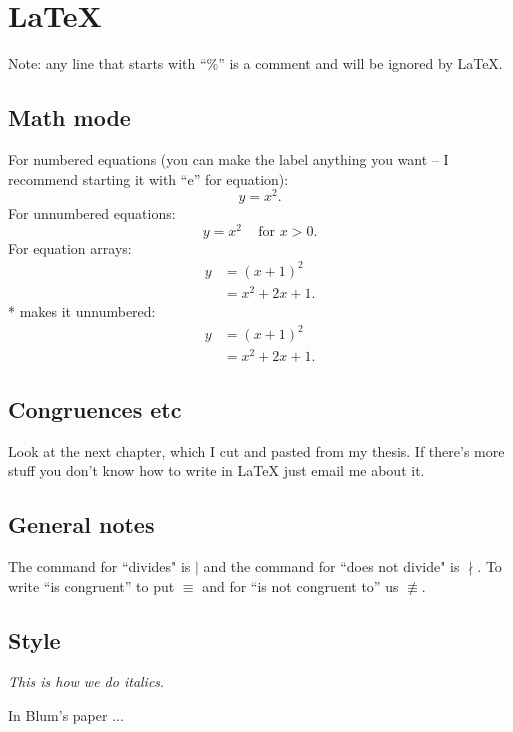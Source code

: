 
\chapter{LaTeX}

Note: any line that starts with ``\%'' is a comment and will be
ignored by LaTeX.

\section{Math mode}

For numbered equations (you can make the label anything you want
-- I recommend starting it with ``e'' for equation):
\begin{equation} \label{e:quadratic}
y = x^2.
\end{equation}
For unnumbered equations:
\[ y = x^2 \; \; \; \text{ for } x > 0. \]
For equation arrays:
\begin{align}
y &= (x+1)^2 \nonumber \\
  &= x^2 + 2x +1.
\end{align}
* makes it unnumbered:
\begin{align*}
y &= (x+1)^2 \nonumber \\
  &= x^2 + 2x +1.
\end{align*}


\section{Congruences etc}

Look at the next chapter, which I cut and pasted from my thesis.
If there's more stuff you don't know how to write in LaTeX just
email me about it.

\section{General notes}

The command for ``divides" is $\mid$ and the command for ``does
not divide" is $\nmid$.  To write ``is congruent'' to put $\equiv$
and for ``is not congruent to'' us $\not \equiv$.

\smallskip


\section{Style}

\emph{This is how we do italics}.

In Blum's paper \cite{Blum1}...

